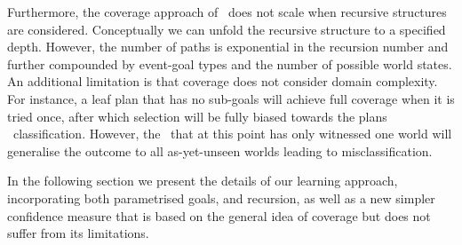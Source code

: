 
Furthermore, the coverage approach of~\cite{Singh:AAMAS10} does not scale
when recursive structures are
considered. Conceptually we can unfold the recursive structure to a
specified depth. However, the number of paths is exponential in the
recursion number and further compounded by event-goal
types and the number of possible world states.
%
An additional limitation is that coverage does not consider domain
complexity. For instance, a leaf plan that has no sub-goals will
achieve full coverage when it is tried once, after which selection
will be fully biased towards the plans \dt\ classification. However,
the \dt\ that at this point has only witnessed one world will
generalise the outcome to all as-yet-unseen worlds leading to
misclassification. 

In the following section we present the details of our learning
approach, incorporating both parametrised goals, and recursion, as
well as a new simpler confidence measure that is based on the 
general idea of coverage but does not suffer from its limitations.







